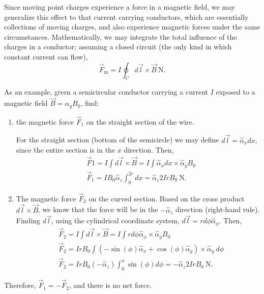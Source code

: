 \documentclass{article}
\begin{document}
Since moving point charges experience a force in a magnetic field, we may generalize this effect to that current carrying conductors, which are essentially collections of moving charges, and also experience magnetic forces under the same circumstances. Mathematically, we may integrate the total influence of the charges in a conductor; assuming a closed circuit (the only kind in which constant current can flow), 
\[
	\vec{F}_{\mathrm{m}} = I \oint_C d \vec{l} \times \vec{B} \ \mathrm{N}.
\]
 
As an example, given a semicircular conductor carrying a current \(I\) exposed to a magnetic field \(\vec{B} = \hat{\alpha}_y B_0\), find:
\begin{enumerate}[label=\alph*)]
	\item the magnetic force \(\vec{F}_1\) on the straight section of the wire.

		For the straight section (bottom of the semicircle) we may define \(d \vec{l} = \hat{\alpha}_x dx\), since the entire section is in the \(x\) direction. Then, 
		\begin{align*}
			&\vec{F}1 = I \int d \vec{l} \times \vec{B} = I \int \hat{\alpha}_x dx \times \hat{\alpha}_y B_0 \\
			&\vec{F}_1 = IB_0\hat{\alpha}_z \int_{0}^{2r}dx = \hat{\alpha}_z 2IrB_0 \ \mathrm{N}.
		\end{align*}
	\item The magnetic force \(\vec{F}_2\) on the curved section.
		Based on the cross product \(d \vec{l} \times \vec{B}\), we know that the force will be in the \(-\hat{\alpha}_z\) direction (right-hand rule). Finding \(d \vec{l}\), using the cylindrical coordinate system, \(d \vec{l} = r d\phi \hat{\alpha}_\phi\). Then, 
		\begin{align*}
			&\vec{F}_2 = I \int d \vec{l} \times \vec{B} = I \int r d \phi \hat{\alpha}_\phi \times \hat{\alpha}_y B_0\\
			&\vec{F}_2 = I r B_0 \int (-\sin{(\phi)} \hat{\alpha}_x + \cos{(\phi)} \hat{\alpha}_y) \times \hat{\alpha}_y \ d \phi \\
			&\vec{F}_2 = I r B_0 (-\hat{\alpha}_z) \int_{0}^{\pi} \sin{(\phi)} d \phi = -\hat{\alpha}_z 2 I r B_0 \ \mathrm{N}.
		\end{align*}
\end{enumerate}
Therefore, \(\vec{F}_1 = -\vec{F}_2\), and there is no net force. 
\end{document}
